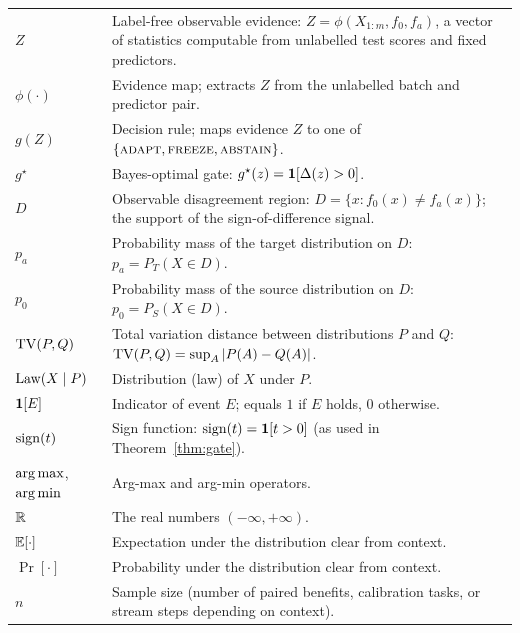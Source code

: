 \begin{longtable}{lp{11cm}}
$Z$ &
  Label-free observable evidence: $Z = \phi(X_{1:m}, f_0, f_a)$, a vector of
  statistics computable from unlabelled test scores and fixed predictors. \\

$\phi(\cdot)$ &
  Evidence map; extracts $Z$ from the unlabelled batch and predictor pair. \\

$g(Z)$ &
  Decision rule; maps evidence $Z$ to one of $\{\textsc{adapt}, \textsc{freeze},
  \textsc{abstain}\}$. \\

$g^\star$ &
  Bayes-optimal gate: $g^\star(z) = \mathbf{1}[\Delta(z) > 0]$. \\

$D$ &
  Observable disagreement region: $D = \{x : f_0(x) \neq f_a(x)\}$;
  the support of the sign-of-difference signal. \\

$p_a$ &
  Probability mass of the target distribution on $D$: $p_a = P_T(X \in D)$. \\

$p_0$ &
  Probability mass of the source distribution on $D$: $p_0 = P_S(X \in D)$. \\

$\mathrm{TV}(P, Q)$ &
  Total variation distance between distributions $P$ and $Q$:
  $\mathrm{TV}(P,Q) = \sup_{A} |P(A) - Q(A)|$. \\

$\mathrm{Law}(X \mid P)$ &
  Distribution (law) of $X$ under $P$. \\

$\mathbf{1}[E]$ &
  Indicator of event $E$; equals $1$ if $E$ holds, $0$ otherwise. \\

$\operatorname{sign}(t)$ &
  Sign function: $\operatorname{sign}(t) = \mathbf{1}[t > 0]$ (as used in
  Theorem~\ref{thm:gate}). \\

$\operatorname*{arg\,max}$, $\operatorname*{arg\,min}$ &
  Arg-max and arg-min operators. \\

$\mathbb{R}$ &
  The real numbers $(-\infty, +\infty)$. \\

$\mathbb{E}[\cdot]$ &
  Expectation under the distribution clear from context. \\

$\Pr[\cdot]$ &
  Probability under the distribution clear from context. \\

$n$ &
  Sample size (number of paired benefits, calibration tasks, or stream steps
  depending on context). \\


\end{longtable}
